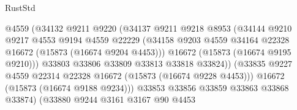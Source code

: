 \begin{lexlean}{RustStd}
\begin{coremodule}
                                        @4559
                                        (@34132
                                          @9211
                                          @9220
                                          (@34137
                                            @9211
                                            @9218
                                            @8953
                                            (@34144
                                              @9210
                                              @9217
                                              @4553
                                              @9194
                                              @4559
                                              @22229
                                              (@34158
                                                @9203
                                                @4559
                                                @34164
                                                @22328
                                                @16672
                                                (@15873 (@16674 @9204 @4453)))
                                              @16672
                                              (@15873 (@16674 @9195 @9210)))
                                            @33803
                                            @33806
                                            @33809
                                            @33813
                                            @33818
                                            @33824))
                                        (@33835
                                          @9227
                                          @4559
                                          @22314
                                          @22328
                                          @16672
                                          (@15873 (@16674 @9228 @4453)))
                                        @16672
                                        (@15873 (@16674 @9188 @9234)))
                                      @33853
                                      @33856
                                      @33859
                                      @33863
                                      @33868
                                      @33874)
                                    (@33880
                                      @9244
                                      @3161
                                      @3167
                                      @90
                                      @4453

\end{coremodule}
\end{lexlean}
